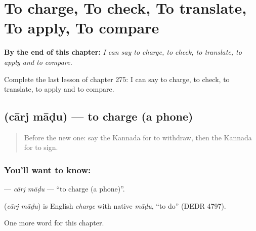 
\chapter{To charge, To check, To translate, To apply, To compare}
\label{ch:ka-to-charge-to-check-to-translate-to-apply-to-compare}

\begin{chapteropening}
\textbf{By the end of this chapter:} \emph{I can say to charge, to check, to translate, to apply and to compare.}

Complete the last lesson of chapter 275: I can say to charge, to check, to translate, to apply and to compare.
\end{chapteropening}

\section[\texorpdfstring{\kn{ಚಾರ್ಜ್} \kn{ಮಾಡು} (cārj māḍu)}{ಚಾರ್ಜ್ ಮಾಡು (cārj māḍu)}]{  (cārj māḍu) — to charge (a phone)}

\label{lesson:KA-C275-carj-madu}



\begin{quote}
Before the new one: say the Kannada for to withdraw, then the Kannada for to sign.
\end{quote}

\subsection*{You'll want to know:  }
\textbf{ } — \emph{cārj māḍu} — \textquotedblleft{}to charge (a phone)\textquotedblright{}.

\begin{cousinweb}
\textbf{ } (\emph{cārj māḍu}) is English \emph{charge} with native \emph{māḍu}, \textquotedblleft{}to do\textquotedblright{} (DEDR 4797).
\end{cousinweb}

\begin{grammarlens}[title={What you've built}]
One more word for this chapter.
\end{grammarlens}


